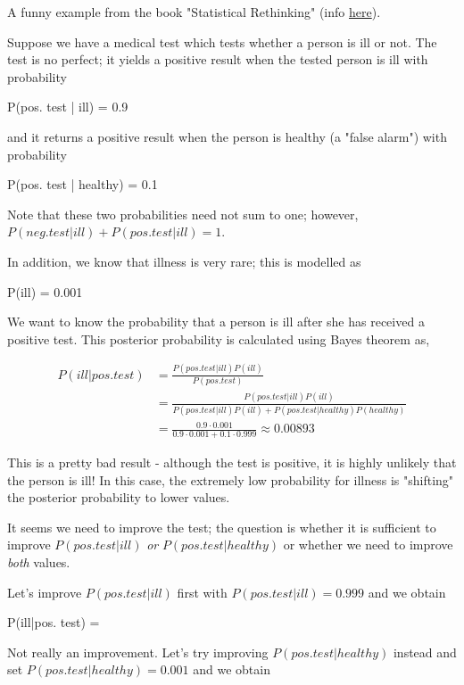 
A funny example from the book "Statistical Rethinking" (info \href{https://xcelab.net/rm/statistical-rethinking/}{here}).

Suppose we have a medical test which tests whether a person is ill or not. The test is no perfect; it yields a positive result when the tested person is ill with probability

\bee
P(pos. test | ill) = 0.9
\eee

and it returns a positive result when the person is healthy (a "false alarm") with probability

\bee
P(pos. test | healthy) = 0.1
\eee

Note that these two probabilities need not sum to one; however, $P(neg. test | ill) + P(pos. test | ill) = 1$.

In addition, we know that illness is very rare; this is modelled as

\bee
P(ill) = 0.001
\eee

We want to know the probability that a person is ill after she has received a positive test. This posterior probability is calculated using Bayes theorem as,

\begin{align*}
P(ill|pos. test) &= \frac{P(pos. test | ill) P(ill)}{P(pos. test)} \\ &= \frac{P(pos. test | ill) P(ill)}{P(pos. test|ill) P(ill) + P(pos. test | healthy) P(healthy)} \\ &= \frac{0.9 \cdot 0.001}{0.9 \cdot 0.001 + 0.1 \cdot 0.999} \approx 0.00893
\end{align*}

This is a pretty bad result - although the test is positive, it is highly unlikely that the person is ill! In this case, the extremely low probability for illness is "shifting" the posterior probability to lower values.

It seems we need to improve the test; the question is whether it is sufficient to improve $P(pos. test | ill)$ \emph{or} $P(pos. test | healthy)$ or whether we need to improve \emph{both} values.

Let's improve $P(pos. test | ill)$ first with $P(pos. test | ill) = 0.999$ and we obtain

\bee
P(ill|pos. test) =  
\eee

Not really an improvement. Let's try improving $P(pos. test | healthy)$ instead and set $P(pos. test | healthy)=0.001$ and we obtain

